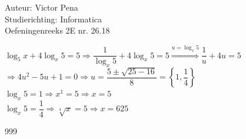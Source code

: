 \documentclass[a4paper]{article}
\begin{document}
	
	\noindent \large Auteur: Victor Pena \\
	\noindent \large Studierichting: Informatica\\
	\noindent \large Oefeningenreeks 2E nr. 26.18\\
	
	\medskip
	
	\normalsize 
	
	$\log_5 x + 4\log_x 5 = 5 \Rightarrow \dfrac{1}{\log_x 5} + 4\log_x 5 = 5 \overset{u = \log_x 5}{\Rightarrow} \dfrac{1}{u} + 4u = 5$ \\
	
	$\Rightarrow 4u^2 -5u + 1 = 0 \Rightarrow u = \dfrac{5 \pm \sqrt{25-16}}{8} = \left\{1,\dfrac{1}{4}\right\}$ \\
	
	$\log_x 5 = 1 \Rightarrow x^1 = 5 \Rightarrow x = 5$ \\
	
	$\log_x 5 = \dfrac{1}{4} \Rightarrow \sqrt[4]{x} = 5 \Rightarrow x = 625$ \\
	
	
	
	\begin{thebibliography}{999}
	\end{thebibliography}
\end{document}

